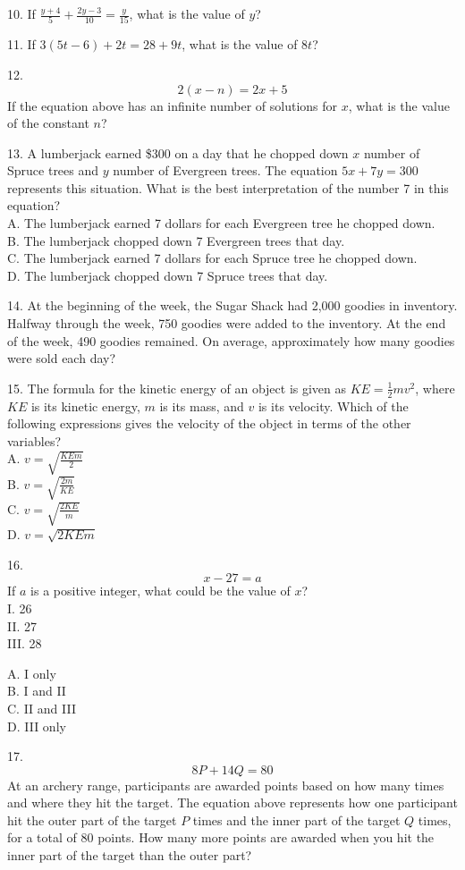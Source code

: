 \documentclass[../satmath.tex]{subfiles}
\begin{document}
10. If $\frac{y+4}{5}+\frac{2y-3}{10}=\frac{y}{15}$, what is the value of $y$?
\medbreak

11. If $3(5t-6)+2t=28+9t$, what is the value of $8t$?
\medbreak

12. 
\[2(x-n)=2x+5\]
If the equation above has an infinite number of solutions for $x$, what is the value of the constant $n$?
\medbreak

13. A lumberjack earned \$300 on a day that he chopped down $x$ number of Spruce trees and $y$ number of Evergreen trees. The equation 
$5x+7y=300$ represents this situation. What is the best interpretation of the number 7 in this equation?\\
A. The lumberjack earned 7 dollars for each Evergreen tree he chopped down.\\
B. The lumberjack chopped down 7 Evergreen trees that day.\\
C. The lumberjack earned 7 dollars for each Spruce tree he chopped down.\\
D. The lumberjack chopped down 7 Spruce trees that day.
\medbreak

14. At the beginning of the week, the Sugar Shack had 2,000 goodies in inventory. Halfway through the week, 750 goodies were added to the inventory.
At the end of the week, 490 goodies remained. On average, approximately how many goodies were sold each day?
\medbreak

15. The formula for the kinetic energy of an object is given as $KE=\frac{1}{2}mv^2$, where $KE$ is its kinetic energy, $m$ is its mass, 
and $v$ is its velocity. Which of the following expressions gives the velocity of the object in terms of the other variables?\\
A. $v=\sqrt{\frac{KEm}{2}}$\\
B. $v=\sqrt{\frac{2m}{KE}}$\\
C. $v=\sqrt{\frac{2KE}{m}}$\\
D. $v=\sqrt{2KEm}$
\medbreak

16. 
\[x-27=a\]
If $a$ is a positive integer, what could be the value of $x$?\\
I. 26\\
II. 27\\
III. 28

A. I only\\
B. I and II\\
C. II and III\\
D. III only
\medbreak

17. 
\[8P+14Q=80\]
At an archery range, participants are awarded points based on how many times and where they hit the target. The equation above represents how 
one participant hit the outer part of the target $P$ times and the inner part of the target $Q$ times, for a total of 80 points. How many more points are 
awarded when you hit the inner part of the target than the outer part?
\medbreak
\end{document}

